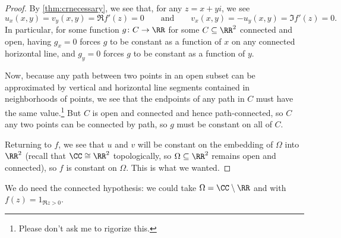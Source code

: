 \begin{proof}
	By \autoref{thm:crnecessary}, we see that, for any $z=x+yi$, we see
	\[u_x(x,y)=v_y(x,y)=\Re f'(z)=0\qquad\text{and}\qquad v_x(x,y)=-u_y(x,y)=\Im f'(z)=0.\]
	In particular, for some function $g\colon C\to\RR$ for some $C\subseteq\RR^2$ connected and open, having $g_x=0$ forces $g$ to be constant as a function of $x$ on any connected horizontal line, and $g_y=0$ forces $g$ to be constant as a function of $y$.

	Now, because any path between two points in an open subset can be approximated by vertical and horizontal line segments contained in neighborhoods of points, we see that the endpoints of any path in $C$ must have the same value.\footnote{Please don't ask me to rigorize this.} But $C$ is open and connected and hence path-connected, so $C$ any two points can be connected by path, so $g$ must be constant on all of $C$.

	Returning to $f$, we see that $u$ and $v$ will be constant on the embedding of $\Omega$ into $\RR^2$ (recall that $\CC\cong\RR^2$ topologically, so $\Omega\subseteq\RR^2$ remains open and connected), so $f$ is constant on $\Omega$. This is what we wanted.
\end{proof}
\begin{remark}
	We do need the connected hypothesis: we could take $\Omega=\CC\setminus\RR$ and with $f(z)=1_{\Re z>0}$.
\end{remark}